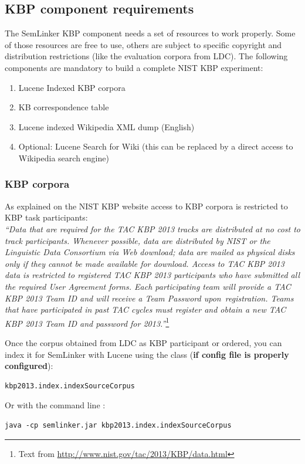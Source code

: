 \documentclass[11pt]{article}
\newcommand{\seml}{SemLinker}
\begin{document}
\subsection{KBP component requirements}
\label{ssec:kbpreqs}
The \seml{} KBP component needs a set of resources to work properly. 
Some of those resources are free to use, others are subject to specific copyright and distribution restrictions (like the evaluation corpora from LDC). 
The following components are mandatory to build a complete NIST KBP experiment:
\begin{enumerate}
 \item Lucene Indexed KBP corpora
 \item KB correspondence table
 \item Lucene indexed Wikipedia XML dump (English)
 \item Optional: Lucene Search for Wiki (this can be replaced by a direct access to Wikipedia search engine)
\end{enumerate}

\subsubsection{KBP corpora}
\label{sssec:kbpcorp}
As explained on the NIST KBP website access to KBP corpora is restricted to KBP task participants:\\
\textit{``Data that are required for the TAC KBP 2013 tracks are distributed at no cost to track participants. 
Whenever possible, data are distributed by NIST or the Linguistic Data Consortium via Web download; 
data are mailed as physical disks only if they cannot be made available for download. 
Access to TAC KBP 2013 data is restricted to registered TAC KBP 2013 participants who have submitted all the required User Agreement forms. 
Each participating team will provide a TAC KBP 2013 Team ID and will receive a Team Password upon registration. 
Teams that have participated in past TAC cycles must register and obtain a new TAC KBP 2013 Team ID and password for 2013.''}\footnote{Text from \url{http://www.nist.gov/tac/2013/KBP/data.html}}

Once the corpus obtained from LDC as KBP participant or ordered, you can index it for \seml{} with Lucene using the class (\textbf{if config file is properly configured}):
\begin{lstlisting}
kbp2013.index.indexSourceCorpus
\end{lstlisting}
Or with the command line :
\begin{lstlisting}
java -cp semlinker.jar kbp2013.index.indexSourceCorpus
\end{lstlisting}
\end{document}
